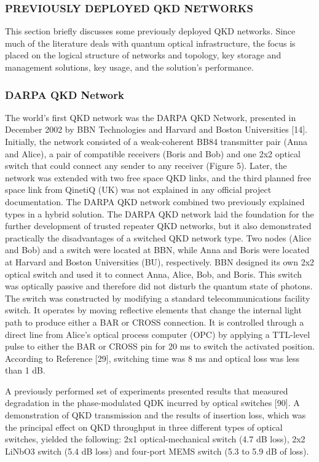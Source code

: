 \subsubsection{PREVIOUSLY DEPLOYED QKD NETWORKS}
This section briefly discusses some previously deployed QKD networks. Since much of the literature deals with quantum optical infrastructure, the focus is placed on the logical structure of networks and topology, key storage and management solutions, key usage, and the solution’s performance.
\subsubsection{DARPA QKD Network}
The world’s first QKD network was the DARPA QKD Network, presented in December 2002 by BBN Technologies and Harvard and Boston Universities [14]. Initially, the network consisted of a weak-coherent BB84 transmitter pair (Anna and Alice), a pair of compatible receivers (Boris and Bob) and one 2x2 optical switch that could connect any sender to any receiver (Figure 5). Later, the network was extended with two free space QKD links, and the third planned free space link from QinetiQ (UK) was not explained in any official project documentation. The DARPA QKD network combined two previously explained types in a hybrid solution. The DARPA QKD network laid the foundation for the further development of trusted repeater QKD networks, but it also demonstrated practically the disadvantages of a switched QKD network type.
Two nodes (Alice and Bob) and a switch were located at BBN, while Anna and Boris were located at Harvard and Boston Universities (BU), respectively. BBN designed its own 2x2 optical switch and used it to connect Anna, Alice, Bob, and Boris. This switch was optically passive and therefore did not disturb the quantum state of photons. The switch was constructed by modifying a standard telecommunications facility switch. It operates by moving reflective elements that change the internal light path to produce either a BAR or CROSS connection. It is controlled through a direct line from Alice’s optical process computer (OPC) by applying a TTL-level pulse to either the BAR or CROSS pin for 20 ms to switch the activated position. According to Reference [29], switching time was 8 ms and optical loss was less than 1 dB.

A previously performed set of experiments presented results that measured degradation in the phase-modulated QDK incurred by optical switches [90]. A demonstration of QKD transmission and the results of insertion loss, which was the principal effect on QKD throughput in three different types of optical switches, yielded the following: 2x1 optical-mechanical switch (4.7 dB loss),
2x2 LiNbO3 switch (5.4 dB loss) and four-port MEMS switch (5.3 to 5.9 dB of loss).

